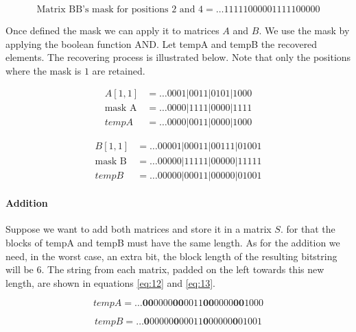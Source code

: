 \documentclass[12pt]{article}
\begin{document}
\begin{equation}\label{eq:09}
\text{Matrix BB's mask for positions 2 and 4} = \ldots11111000001111100000
\end{equation}

Once defined the mask we can apply it to matrices $A$ and $B$. We use the mask
by applying the boolean function AND. Let tempA and tempB the recovered
elements. The recovering process is illustrated below. Note that only the
positions where the mask is $1$ are retained.

  \begin{align*}
   A[1,1]			&=	\ldots0001|0011|0101|1000\\
   \text{mask A}	&=	\ldots0000|1111|0000|1111\\
   tempA 			&=	\ldots0000|0011|0000|1000
  \end{align*}

  \begin{align*}
   B[1,1]			&= \ldots00001|00011|00111|01001 \\
   \text{mask B}	&= \ldots00000|11111|00000|11111 \\
   tempB 			&= \ldots00000|00011|00000|01001
  \end{align*}

\paragraph{Addition}

Suppose we want to add both matrices and store it in a matrix $S$. for that the
blocks of tempA and tempB must have the same length. As for the addition we
need, in the worst case, an extra bit, the block length of the resulting
bitstring will be 6. The string from each matrix, padded on the left towards
this new length,  are shown in equations \ref{eq:12} and \ref{eq:13}.

\begin{equation}\label{eq:12}
tempA =  \ldots\textbf{00}0000\textbf{00}0011\textbf{00}0000\textbf{00}1000
\end{equation}

\begin{equation}\label{eq:13}
tempB =  \ldots\textbf{0}00000\textbf{0}00011\textbf{0}00000\textbf{0}01001
\end{equation}
\end{document}
